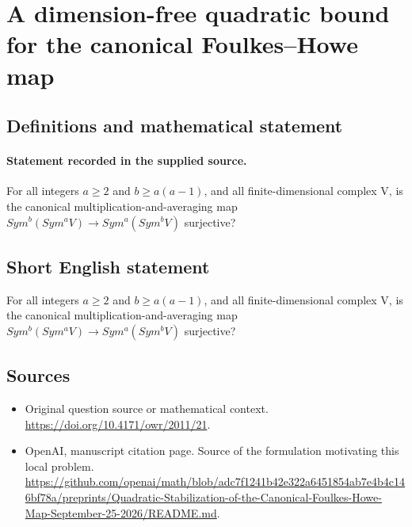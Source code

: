 \documentclass[11pt]{article}
\begin{document}
\section*{A dimension-free quadratic bound for the canonical Foulkes–Howe map}\label{statement}
\subsection{Definitions and mathematical statement}
\paragraph{Statement recorded in the supplied source.}
For all integers $a\geq 2$ and $b\geq a(a-1)$, and all finite-dimensional complex V, is the canonical multiplication-and-averaging map $Sym^{b}(Sym^{a}V)\to Sym^{a}(Sym^{b}V)$ surjective?
\subsection{Short English statement}
For all integers $a\geq 2$ and $b\geq a(a-1)$, and all finite-dimensional complex V, is the canonical multiplication-and-averaging map $Sym^{b}(Sym^{a}V)\to Sym^{a}(Sym^{b}V)$ surjective?
\subsection{Sources}
\begin{itemize}
\item[S1] Original question source or mathematical context.
\url{https://doi.org/10.4171/owr/2011/21}.
\item[S2] OpenAI, manuscript citation page. Source of the formulation motivating this local problem.
\url{https://github.com/openai/math/blob/adc7f1241b42e322a6451854ab7e4b4c146bf78a/preprints/Quadratic-Stabilization-of-the-Canonical-Foulkes-Howe-Map-September-25-2026/README.md}.
\end{itemize}
\end{document}
